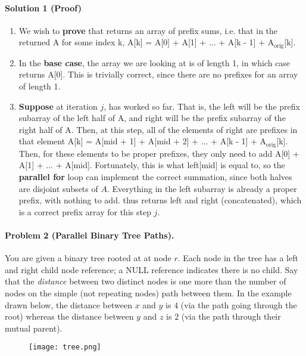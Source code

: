 \documentclass[11pt]{article}
\begin{document}
\paragraph{Solution 1 (Proof)}

\begin{enumerate}
    \item We wish to \textbf{prove} that  returns an array of prefix sums, i.e. that in the returned A for some index k, A[k] = A[0] + A[1] + ... + A[k - 1] + $\text{A}_{\text{orig}}$[k].
    \item In the \textbf{base case}, the array we are looking at is of length 1, in which case  returns A[0]. This is trivially correct, since
        there are no prefixes for an array of length 1.
    \item \textbf{Suppose} at iteration $j$,  has worked so far. That is, the left will be the prefix subarray of the left half of A, and right will be the prefix subarray of the right half of A. Then, at this step, all of the elements of right are prefixes in that element A[k] = A[mid + 1] + A[mid + 2] + ... + A[k - 1] + $\text{A}_{\text{orig}}$[k]. Then, for these elements to be proper prefixes, they only need to add A[0] + A[1] + ... + A[mid]. Fortunately, this is what left[mid] is equal to, so the \textbf{parallel for} loop can implement the correct summation, since both halves are disjoint subsets of $A$. Everything in the left subarray is already a proper prefix, with nothing to add.  thus returns left and right (concatenated), which is a correct prefix array for this step $j$.
\end{enumerate}

\newpage
\paragraph{Problem 2 (Parallel Binary Tree Paths).} You are given a binary tree rooted at at node $r$. Each node in the tree has a left and right child node reference; a NULL reference indicates there is no child. Say that the \textit{distance} between two distinct nodes is one more than the number of nodes on the simple (not repeating nodes) path between them. In the example drawn below, the distance between $x$ and $y$ is $4$ (via the path going through the root) whereas the distance between $y$ and $z$ is $2$ (via the path through their mutual parent). 

\vspace{-0.125in}
\begin{figure}[!h]
\centering
\texttt{[image: tree.png]}
\end{figure}
\vspace{-0.125in}
\end{document}
